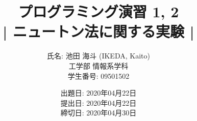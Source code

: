 \documentclass[12pt]{jarticle}
\begin{document}
\title{プログラミング演習 1, 2 \\ | ニュートン法に関する実験 |}

\date{出題日: 2020年04月22日 \\
      提出日: 2020年04月22日 \\
      締切日: 2020年04月30日 \\}

\author{氏名: 池田 海斗 (IKEDA, Kaito) \\
        工学部 情報系学科 \\
        学生番号: 09501502}

\maketitle

\end{document}
